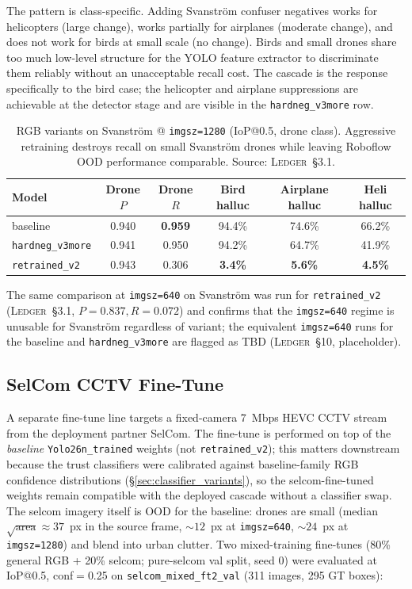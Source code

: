 \documentclass[12pt,a4paper,oneside,openright]{book}
\begin{document}
The pattern is class-specific. Adding Svanstr\"om confuser negatives works for helicopters (large change), works partially for airplanes (moderate change), and does not work for birds at small scale (no change). Birds and small drones share too much low-level structure for the YOLO feature extractor to discriminate them reliably without an unacceptable recall cost. The cascade is the response specifically to the bird case; the helicopter and airplane suppressions are achievable at the detector stage and are visible in the \texttt{hardneg\_v3more} row.

\begin{table}[htbp]
    \centering
    \caption{RGB variants on Svanstr\"om @ \texttt{imgsz=1280} (IoP@0.5, drone class). Aggressive retraining destroys recall on small Svanstr\"om drones while leaving Roboflow OOD performance comparable. Source: \textsc{Ledger}~\S3.1.}
    \label{tab:rgb_comparison}
    \begin{tabular}{lccccc}
        \toprule
        Model & Drone $P$ & Drone $R$ & Bird halluc & Airplane halluc & Heli halluc \\
        \midrule
        baseline           & 0.940 & \textbf{0.959} & 94.4\% & 74.6\% & 66.2\% \\
        \texttt{hardneg\_v3more}  & 0.941 & 0.950 & 94.2\% & 64.7\% & 41.9\% \\
        \texttt{retrained\_v2}    & 0.943 & 0.306 & \textbf{3.4\%}  & \textbf{5.6\%}  & \textbf{4.5\%}  \\
        \bottomrule
    \end{tabular}
\end{table}

The same comparison at \texttt{imgsz=640} on Svanstr\"om was run for \texttt{retrained\_v2} (\textsc{Ledger}~\S3.1, $P=0.837, R=0.072$) and confirms that the \texttt{imgsz=640} regime is unusable for Svanstr\"om regardless of variant; the equivalent \texttt{imgsz=640} runs for the baseline and \texttt{hardneg\_v3more} are flagged as TBD (\textsc{Ledger}~\S10, placeholder).

\subsection{SelCom CCTV Fine-Tune}
\label{sec:selcom_finetune}

A separate fine-tune line targets a fixed-camera 7~Mbps HEVC CCTV stream from the deployment partner SelCom. The fine-tune is performed on top of the \emph{baseline} \texttt{Yolo26n\_trained} weights (not \texttt{retrained\_v2}); this matters downstream because the trust classifiers were calibrated against baseline-family RGB confidence distributions (\S\ref{sec:classifier_variants}), so the selcom-fine-tuned weights remain compatible with the deployed cascade without a classifier swap. The selcom imagery itself is OOD for the baseline: drones are small (median $\sqrt{\text{area}} \approx 37$~px in the source frame, $\sim 12$~px at \texttt{imgsz=640}, $\sim 24$~px at \texttt{imgsz=1280}) and blend into urban clutter. Two mixed-training fine-tunes (80\% general RGB + 20\% selcom; pure-selcom val split, seed 0) were evaluated at IoP@0.5, conf$=$0.25 on \texttt{selcom\_mixed\_ft2\_val} (311 images, 295 GT boxes):
\end{document}
